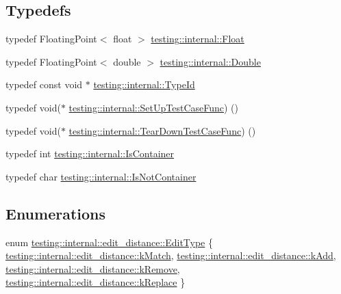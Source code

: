 \subsection*{Typedefs}
\begin{DoxyCompactItemize}
\item 
typedef Floating\+Point$<$ float $>$ \mbox{\hyperlink{namespacetesting_1_1internal_a02e1981f5ff70609e6ac06e006ff519a}{testing\+::internal\+::\+Float}}
\item 
typedef Floating\+Point$<$ double $>$ \mbox{\hyperlink{namespacetesting_1_1internal_a66a7579b1893b260c31dad577f7a5c48}{testing\+::internal\+::\+Double}}
\item 
typedef const void $\ast$ \mbox{\hyperlink{namespacetesting_1_1internal_ab1114197d3c657d8b7f8e0c5caa12d00}{testing\+::internal\+::\+Type\+Id}}
\item 
typedef void($\ast$ \mbox{\hyperlink{namespacetesting_1_1internal_a30037044c0b57cdd647c7e2e97cb2cff}{testing\+::internal\+::\+Set\+Up\+Test\+Case\+Func}}) ()
\item 
typedef void($\ast$ \mbox{\hyperlink{namespacetesting_1_1internal_a085e31321d0d029c04d2a79234f60c1a}{testing\+::internal\+::\+Tear\+Down\+Test\+Case\+Func}}) ()
\item 
typedef int \mbox{\hyperlink{namespacetesting_1_1internal_ad8f0c2883245f1df2a53618a49f0deb3}{testing\+::internal\+::\+Is\+Container}}
\item 
typedef char \mbox{\hyperlink{namespacetesting_1_1internal_abf080521ce135deb510e0a7830fd3d33}{testing\+::internal\+::\+Is\+Not\+Container}}
\end{DoxyCompactItemize}
\subsection*{Enumerations}
\begin{DoxyCompactItemize}
\item 
enum \mbox{\hyperlink{namespacetesting_1_1internal_1_1edit__distance_ad46aa6da12aec1a3f166310478b53a08}{testing\+::internal\+::edit\+\_\+distance\+::\+Edit\+Type}} \{ \mbox{\hyperlink{namespacetesting_1_1internal_1_1edit__distance_ad46aa6da12aec1a3f166310478b53a08a7bdb9c74613a94f21b7489e0b5640a63}{testing\+::internal\+::edit\+\_\+distance\+::k\+Match}}, 
\mbox{\hyperlink{namespacetesting_1_1internal_1_1edit__distance_ad46aa6da12aec1a3f166310478b53a08a63400b073f5b311a87d568b5ae27ffe8}{testing\+::internal\+::edit\+\_\+distance\+::k\+Add}}, 
\mbox{\hyperlink{namespacetesting_1_1internal_1_1edit__distance_ad46aa6da12aec1a3f166310478b53a08a814768ef6cd0264a0a10b1e701a63e78}{testing\+::internal\+::edit\+\_\+distance\+::k\+Remove}}, 
\mbox{\hyperlink{namespacetesting_1_1internal_1_1edit__distance_ad46aa6da12aec1a3f166310478b53a08afdbf30ecf9f32f60c646a34a358615f2}{testing\+::internal\+::edit\+\_\+distance\+::k\+Replace}}
 \}
\end{DoxyCompactItemize}
